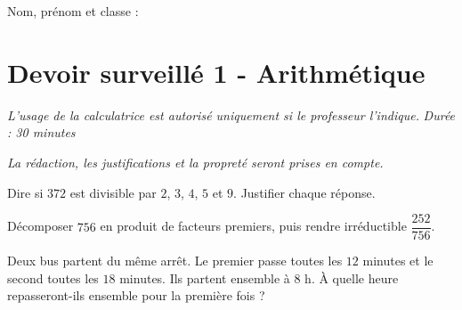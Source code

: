 \documentclass[a4paper,10pt]{report}
\begin{document}
\pagestyle{empty}
\noindent Nom, prénom et classe : \dotfill

\section*{Devoir surveillé 1 - Arithmétique}

\noindent \textit{L'usage de la calculatrice est autorisé uniquement si le professeur l'indique.} \hfill \textit{Durée : 30 minutes}

\medskip
\noindent \textit{La rédaction, les justifications et la propreté seront prises en compte.}


\begin{ex}[Divisibilité]
Dire si $372$ est divisible par $2$, $3$, $4$, $5$ et $9$. Justifier chaque réponse.
\medskip\noindent\grandscarreaux{\linewidth}{3.5cm}
\end{ex}
\begin{ex}
Décomposer $756$ en produit de facteurs premiers, puis rendre irréductible $\dfrac{252}{756}$.
\medskip\noindent\grandscarreaux{\linewidth}{5cm}
\end{ex}
\begin{ex}[Problème]
Deux bus partent du même arrêt. Le premier passe toutes les $12$ minutes et le second toutes les $18$ minutes. Ils partent ensemble à $8$ h. À quelle heure repasseront-ils ensemble pour la première fois ?
\medskip\noindent\grandscarreaux{\linewidth}{4cm}
\end{ex}
\end{document}
